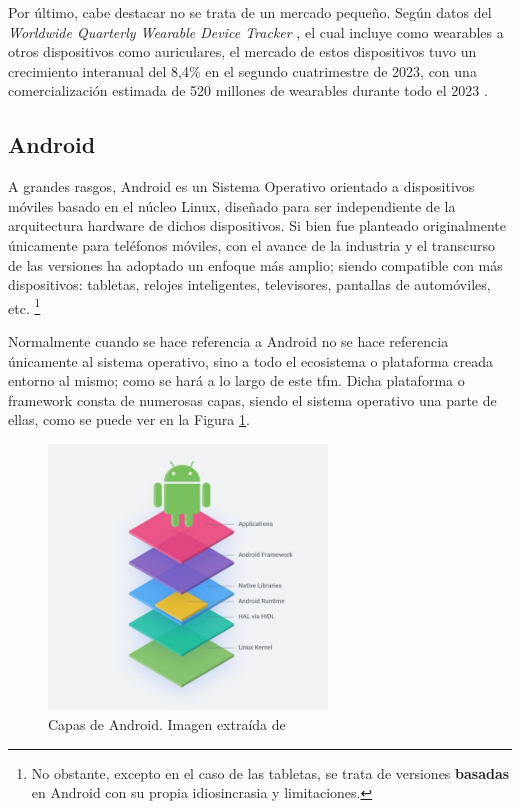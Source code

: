         Por último, cabe destacar no se trata de un mercado pequeño. Según datos del \textit{Worldwide Quarterly Wearable Device Tracker} \cite{international_data_corporation_worldwide_nodate}, el cual incluye como \glspl{wearable} a otros dispositivos como auriculares, el mercado de estos dispositivos tuvo un crecimiento interanual del 8,4\% en el segundo cuatrimestre de 2023, con una comercialización estimada de 520 millones de \glspl{wearable} durante todo el 2023 \cite{ricca_resurreccion_2023}.
        
    \subsection{Android}
        \label{section:contexto:Android}
        
        A grandes rasgos, Android es un Sistema Operativo orientado a dispositivos móviles basado en el núcleo Linux, diseñado para ser independiente de la arquitectura hardware de dichos dispositivos. Si bien fue planteado originalmente únicamente para teléfonos móviles, con el avance de la industria y el transcurso de las versiones ha adoptado un enfoque más amplio; siendo compatible con más dispositivos: tabletas, relojes inteligentes, televisores, pantallas de automóviles, etc. \footnote{No obstante, excepto en el caso de las tabletas, se trata de versiones \textbf{basadas} en Android con su propia 
        idiosincrasia y limitaciones.}
  
        Normalmente cuando se hace referencia a Android no se hace referencia únicamente al sistema operativo, sino a todo el ecosistema o plataforma creada entorno al mismo; como se hará a lo largo de este \gls{tfm}. Dicha plataforma o 
        \gls{framework} consta de numerosas capas, siendo el sistema operativo una parte de ellas, como se puede ver en la Figura \ref{figure:android:capas}. 

        \begin{figure}[h]
            \centering
            \includegraphics[width=0.66\textwidth]{figures/Android capas.jpg}
            \caption[Capas de Android]
            {Capas de Android. Imagen extraída de \cite{perez_aosp_2019}}
            \label{figure:android:capas}
        \end{figure}
        
